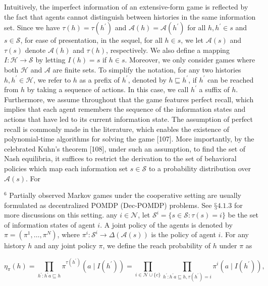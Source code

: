 \documentclass[10pt]{article}
\begin{document}
Intuitively, the imperfect information of an extensive-form game is reflected by the fact that agents cannot distinguish between histories in the same information set. Since we have $\tau(h)=\tau\left(h^{\prime}\right)$ and $\mathcal{A}(h)=\mathcal{A}\left(h^{\prime}\right)$ for all $h, h^{\prime} \in s$ and $s \in \mathcal{S}$, for ease of presentation, in the sequel, for all $h \in s$, we let $\mathcal{A}(s)$ and $\tau(s)$ denote $\mathcal{A}(h)$ and $\tau(h)$, respectively. We also define a mapping $I: \mathcal{H} \rightarrow \mathcal{S}$ by letting $I(h)=s$ if $h \in s$. Moreover, we only consider games where both $\mathcal{H}$ and $\mathcal{A}$ are finite sets. To simplify the notation, for any two histories $h, h^{\prime} \in \mathcal{H}$, we refer to $h$ as a prefix of $h^{\prime}$, denoted by $h \sqsubseteq h^{\prime}$, if $h^{\prime}$ can be reached from $h$ by taking a sequence of actions. In this case, we call $h^{\prime}$ a suffix of $h$. Furthermore, we assume throughout that the game features perfect recall, which implies that each agent remembers the sequence of the information states and actions that have led to its current information state. The assumption of perfect recall is commonly made in the literature, which enables the existence of polynomial-time algorithms for solving the game [107]. More importantly, by the celebrated Kuhn's theorem [108], under such an assumption, to find the set of Nash equilibria, it suffices to restrict the derivation to the set of behavioral policies which map each information set $s \in \mathcal{S}$ to a probability distribution over $\mathcal{A}(s)$. For

${ }^{6}$ Partially observed Markov games under the cooperative setting are usually formulated as decentralized POMDP (Dec-POMDP) problems. See $§ 4.1 .3$ for more discussions on this setting. any $i \in \mathcal{N}$, let $\mathcal{S}^{i}=\{s \in \mathcal{S}: \tau(s)=i\}$ be the set of information states of agent $i$. A joint policy of the agents is denoted by $\pi=\left(\pi^{1}, \ldots, \pi^{N}\right)$, where $\pi^{i}: \mathcal{S}^{i} \rightarrow \Delta(\mathcal{A}(s))$ is the policy of agent $i$. For any history $h$ and any joint policy $\pi$, we define the reach probability of $h$ under $\pi$ as

\[
\eta_{\pi}(h)=\prod_{h^{\prime}: h^{\prime} a \sqsubseteq h} \pi^{\tau\left(h^{\prime}\right)}\left(a \mid I\left(h^{\prime}\right)\right)=\prod_{i \in \mathcal{N} \cup\{c\}} \prod_{h^{\prime}: h^{\prime} a \sqsubseteq h, \tau\left(h^{\prime}\right)=i} \pi^{i}\left(a \mid I\left(h^{\prime}\right)\right),
\]
\end{document}
